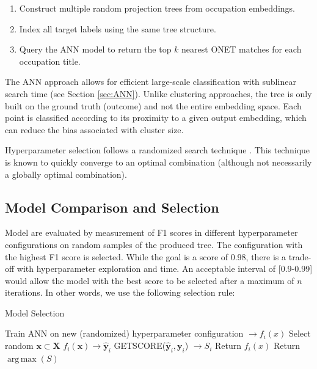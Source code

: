 \documentclass[12pt]{article}
\DeclareMathOperator*{\argmax}{arg\,max}
\begin{document}
\begin{enumerate}
    \item Construct multiple random projection trees from occupation embeddings.
    \item Index all target labels using the same tree structure.
    \item Query the ANN model to return the top \(k\) nearest ONET matches for each occupation title.
\end{enumerate}

The ANN approach allows for efficient large-scale classification with sublinear search time (see Section \ref{sec:ANN}). Unlike clustering approaches, the tree is only built on the ground truth (outcome) and not the entire embedding space. Each point is classified according to its proximity to a given output embedding, which can reduce the bias associated with cluster size.

Hyperparameter selection follows a randomized search technique \cite{bergstra12a_randomSearch}. This technique is known to quickly converge to an optimal combination (although not necessarily a globally optimal combination). 

\subsection{Model Comparison and Selection}

Model are evaluated by measurement of F1 scores in different hyperparameter configurations on random samples of the produced tree. The configuration with the highest F1 score is selected. While the goal is a score of 0.98, there is a trade-off with hyperparameter exploration and time. An acceptable interval of [0.9-0.99] would allow the model with the best score to be selected after a maximum of $n$ iterations. In other words, we use the following selection rule:

\begin{algorithm}
\caption{Model Selection}\label{alg:annoy}
\begin{algorithmic}[1]
    \State Train ANN on new (randomized) hyperparameter configuration $\to f_i(x)$
    \State Select random $\mathbf{x} \subset \mathbf{X}$
    \State $f_i(\mathbf{x}) \to \mathbf{\hat{y}}_i$
    \State GETSCORE($\hat{\mathbf{y}}_i, \mathbf{y}_i $) $\to S_i$
    \State Return $f_i(x)$
    \EndIf
    \State Return $\argmax(S)$\
    \EndIf
    \EndFor
\end{algorithmic}
\end{algorithm}
\end{document}
